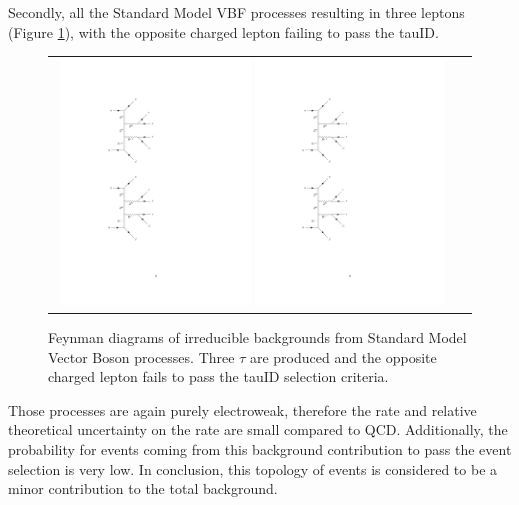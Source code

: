 Secondly, all the Standard Model VBF processes resulting in three leptons (Figure \ref{fig:background_SMVBFZ0Wmiss}), with the opposite charged lepton failing to pass the tauID.

\begin{figure}[tbh!]
	\centering
	\begin{tabular}{cc}
		\includegraphics[width=0.48\textwidth]{diagrams/pics/background_SMVBFZ0Wmissminus.pdf}
		\includegraphics[width=0.48\textwidth]{diagrams/pics/background_SMVBFZ0Wmissplus.pdf} 		
	\end{tabular}
	\caption{Feynman diagrams of irreducible backgrounds from Standard Model Vector Boson  processes. Three $\tau$ are produced and the opposite charged lepton fails to pass the tauID selection criteria. }
	\label{fig:background_SMVBFZ0Wmiss}
\end{figure}

Those processes are again purely electroweak, therefore the rate and relative theoretical uncertainty on the rate are small compared to QCD. Additionally, the probability for events coming from this background contribution to pass the event selection is very low. In conclusion, this topology of events is considered to be a minor contribution to the total background.  

